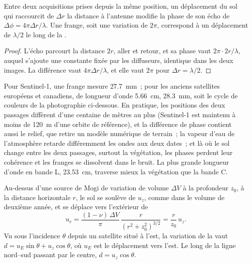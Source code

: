 \begin{theorem}\label{thm:b3:remote-sensing-gis:fringe}
Entre deux acquisitions prises depuis la même position, un déplacement du
sol qui raccourcit de $\Delta r$ la distance à l'antenne modifie la
phase de son écho de $\Delta\phi = 4\pi\Delta r/\lambda$. Une frange, soit une
variation de $2\pi$, correspond à un déplacement de $\lambda/2$ le long de la .
\end{theorem}

\begin{proof}
L'écho parcourt la distance $2r$, aller et retour, et sa phase vaut
$2\pi\cdot 2r/\lambda$, auquel s'ajoute une constante fixée par les diffuseurs, identique dans
les deux images. La différence vaut $4\pi\Delta r/\lambda$, et elle vaut $2\pi$
pour $\Delta r = \lambda/2$.
\end{proof}

Pour Sentinel-1, une frange mesure \qty{27.7}{mm}~; pour les anciens satellites européens et
canadiens, de longueur d'onde \qty{5.66}{cm}, \qty{28.3}{mm}, soit le
cycle de couleurs de la photographie ci-dessous. En pratique, les positions des
deux passages diffèrent d'une centaine de mètres au plus (Sentinel-1 est maintenu
à moins de \qty{120}{m} d'une orbite de référence), et la différence de phase
contient aussi le relief, que retire un modèle numérique de terrain~; la
vapeur d'eau de l'atmosphère retarde différemment les ondes aux deux dates~;
et là où le sol change entre les deux passages, surtout la végétation, les
phases perdent leur cohérence et les franges se dissolvent dans le bruit. La
plus grande longueur d'onde en bande L, \qty{23.53}{cm}, traverse mieux la végétation
que la bande C.

\begin{proposition}\label{prop:b3:remote-sensing-gis:mogi-los}
Au-dessus d'une source de Mogi de variation de volume $\Delta V$ à la profondeur $z_0$, à
la distance horizontale $r$, le sol se soulève de $u_z$, comme dans le
volume de deuxième année, et se déplace vers l'extérieur de
\[
u_r = \frac{(1 - \nu)\,\Delta V}{\pi}\,\frac{r}{(r^2 + z_0^2)^{3/2}} = \frac{r}{z_0}\,u_z .
\]
Vu sous l'incidence $\theta$ depuis un satellite situé à l'est, la variation de
la  vaut $d = u_E\sin\theta + u_z\cos\theta$, où $u_E$ est le
déplacement vers l'est. Le long de la ligne nord--sud passant par le centre,
$d = u_z\cos\theta$.
\end{proposition}

